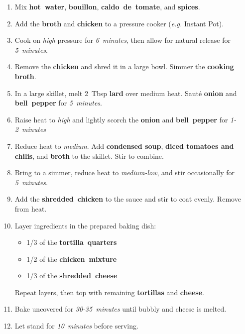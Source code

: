 \documentclass[11pt,letterpaper]{article}
\begin{document}
\begin{enumerate}
	\item Mix \textbf{hot~water}, \textbf{bouillon}, \textbf{caldo~de~tomate}, and \textbf{spices}.
    \item Add the \textbf{broth} and \textbf{chicken} to a pressure cooker (\textit{e.g.} Instant Pot).
	\item Cook on \textit{high} pressure for \textit{6~minutes}, then allow for natural release for \textit{5~minutes}.
	\item Remove the \textbf{chicken} and shred it in a large bowl. Simmer the \textbf{cooking broth}.
	\item In a large skillet, melt 2~Tbsp \textbf{lard} over medium heat. Sauté \textbf{onion} and \textbf{bell~pepper} for \textit{5~minutes}.
	\item Raise heat to \textit{high} and lightly scorch the \textbf{onion} and \textbf{bell~pepper} for \textit{1-2~minutes}
    \item Reduce heat to \textit{medium}. Add \textbf{condensed soup}, \textbf{diced tomatoes and chilis}, and \textbf{broth} to the skillet. Stir to combine.
    \item Bring to a simmer, reduce heat to \textit{medium-low}, and stir occasionally for \textit{5~minutes}.
    \item Add the \textbf{shredded~chicken} to the sauce and stir to coat evenly. Remove from heat.
    \item Layer ingredients in the prepared baking dish:
    \begin{itemize}
        \item 1/3 of the \textbf{tortilla~quarters}
        \item 1/2 of the \textbf{chicken~mixture}
        \item 1/3 of the \textbf{shredded~cheese}
    \end{itemize}
    Repeat layers, then top with remaining \textbf{tortillas} and \textbf{cheese}.
    \item Bake uncovered for \textit{30-35~minutes} until bubbly and cheese is melted.
    \item Let stand for \textit{10~minutes} before serving.
\end{enumerate}
\end{document}
